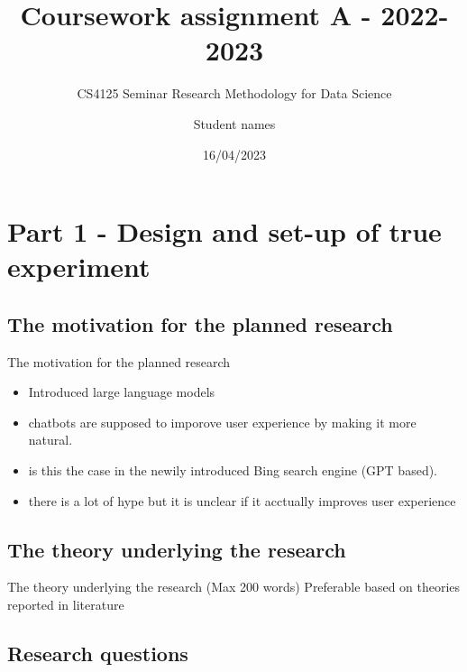 \documentclass[
  ignorenonframetext,
]{beamer}
\title{Coursework assignment A - 2022-2023}
\subtitle{CS4125 Seminar Research Methodology for Data Science}
\author{Student names}
\date{16/04/2023}
\providecommand{\tightlist}{%
  \setlength{\itemsep}{0pt}\setlength{\parskip}{0pt}}
\begin{document}
\frame{\titlepage}

\begin{frame}
\tableofcontents
\end{frame}

\hypertarget{part-1---design-and-set-up-of-true-experiment}{%
\section{Part 1 - Design and set-up of true
experiment}\label{part-1---design-and-set-up-of-true-experiment}}

\hypertarget{the-motivation-for-the-planned-research}{%
\subsection{The motivation for the planned
research}\label{the-motivation-for-the-planned-research}}

\begin{frame}{The motivation for the planned research}
\begin{itemize}
\tightlist
\item
  Introduced large language models
\item
  chatbots are supposed to imporove user experience by making it more
  natural.
\item
  is this the case in the newily introduced Bing search engine (GPT
  based).
\item
  there is a lot of hype but it is unclear if it acctually improves user
  experience
\end{itemize}
\end{frame}

\hypertarget{the-theory-underlying-the-research}{%
\subsection{The theory underlying the
research}\label{the-theory-underlying-the-research}}

\begin{frame}{The theory underlying the research}
(Max 200 words) Preferable based on theories reported in literature
\end{frame}

\hypertarget{research-questions}{%
\subsection{Research questions}\label{research-questions}}
\end{document}
